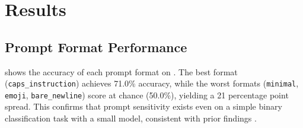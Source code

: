 \section{Results}
\label{sec:results}

\subsection{Prompt Format Performance}
\label{sec:format_performance}

 shows the accuracy of each prompt format on \ssttwo.
The best format (\texttt{caps\_instruction}) achieves 71.0\% accuracy, while the worst formats (\texttt{minimal}, \texttt{emoji}, \texttt{bare\_newline}) score at chance (50.0\%), yielding a 21 percentage point spread.
This confirms that prompt sensitivity exists even on a simple binary classification task with a small model, consistent with prior findings \citep{sclar2023quantifying}.

